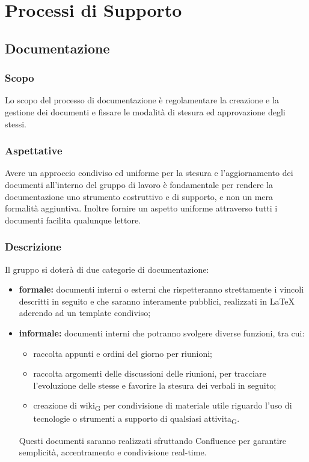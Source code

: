 \section{Processi di Supporto}
\label{supporto}
\subsection{Documentazione}
    \subsubsection{Scopo}
    Lo scopo del processo di documentazione è regolamentare la creazione e la gestione dei documenti e fissare le modalità di stesura ed approvazione degli stessi.
    \subsubsection{Aspettative}
    Avere un approccio condiviso ed uniforme per la stesura e l'aggiornamento dei documenti all'interno del gruppo di lavoro è fondamentale per rendere la documentazione uno strumento costruttivo e di supporto, e non un mera formalità aggiuntiva.
    Inoltre fornire un aspetto uniforme attraverso tutti i documenti facilita qualunque lettore.
    \subsubsection{Descrizione}
    Il gruppo \group si doterà di due categorie di documentazione:
    \begin{itemize}
        \item \textbf{formale: }documenti interni o esterni che rispetteranno strettamente i vincoli descritti in seguito e che saranno interamente pubblici, realizzati in \LaTeX{} aderendo ad un template condiviso;
        \item \textbf{informale: }documenti interni che potranno svolgere diverse funzioni, tra cui:
        \begin{itemize}
            \item  raccolta appunti e ordini del giorno per riunioni;
            \item  raccolta argomenti delle discussioni delle riunioni, per tracciare l'evoluzione delle stesse e favorire la stesura dei verbali in seguito;
            \item  creazione di \gls{wiki}\textsubscript{G} per condivisione di materiale utile riguardo l'uso di tecnologie o strumenti a supporto di qualsiasi \gls{attivita}\textsubscript{G}.
        \end{itemize}
        Questi documenti saranno realizzati sfruttando Confluence per garantire semplicità, accentramento e condivisione real-time.

    \end{itemize}
